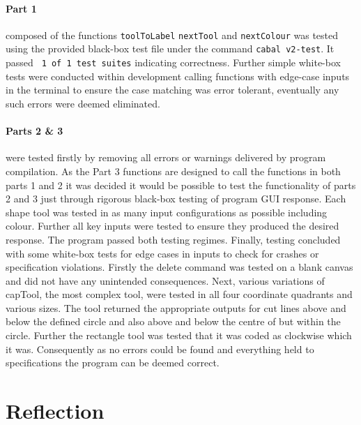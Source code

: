 \documentclass[11pt]{article}
\begin{document}
\paragraph{Part 1} 
 composed of the functions \verb|toolToLabel| \verb|nextTool| and \verb|nextColour| was tested using the provided black-box test file under the command \verb|cabal v2-test|. It passed \verb| 1 of 1 test suites| indicating correctness. Further simple white-box tests were conducted within development calling functions with edge-case inputs in the terminal to ensure the case matching was error tolerant, eventually any such errors were deemed eliminated.
 
\paragraph{Parts 2 \& 3} 
were tested firstly by removing all errors or warnings delivered by program compilation. As the Part 3 functions are designed to call the functions in both parts 1 and 2 it was decided it would be possible to test the functionality of parts 2 and 3 just through rigorous black-box testing of program GUI response. Each shape tool was tested in as many input configurations as possible including colour. Further all key inputs were tested to ensure they produced the desired response. The program passed both testing regimes. Finally, testing concluded with some white-box tests for edge cases in inputs to check for crashes or specification violations. Firstly the delete command was tested on a blank canvas and did not have any unintended consequences. Next, various variations of capTool, the most complex tool, were tested in all four coordinate quadrants and various sizes. The tool returned the appropriate outputs for cut lines above and below the defined circle and also above and below the centre of but within the circle. Further the rectangle tool was tested that it was coded as clockwise which it was. Consequently as no errors could be found and everything held to specifications the program can be deemed correct.
\section{Reflection}
\end{document}
